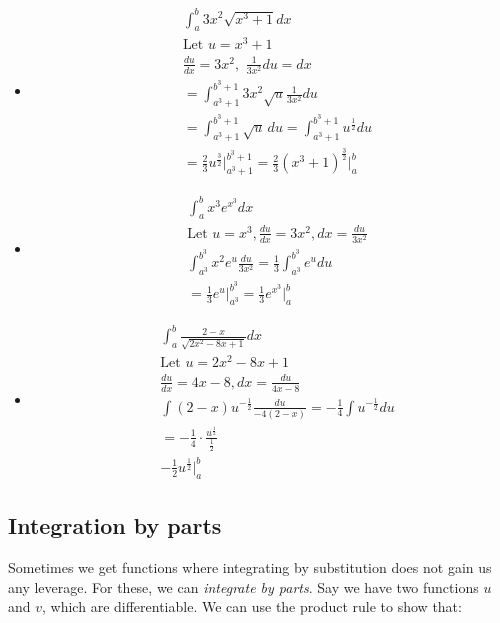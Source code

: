 \begin{itemize}
    \item 
    \begin{align*}
        & \int_a^b 3x^2 \sqrt{x^3 + 1}dx \\
        & \text{Let } u = x^3 + 1 \\
        & \frac{du}{dx} = 3x^2, \, \, \frac{1}{3x^2}du = dx \\
        & = \int_{a^3+1}^{b^3 + 1} 3x^2 \sqrt{u}\frac{1}{3x^2}du \\
        & = \int_{a^3 + 1}^{b^3 + 1} \sqrt{u}\,du = \int_{a^3 + 1}^{b^3 + 1} u^{\frac{1}{2}}du \\
        & = \frac{2}{3}u^{\frac{3}{2}}\Big\vert_{a^3 + 1}^{b^3 + 1} = \frac{2}{3}(x^3 + 1)^{\frac{3}{2}} \Big\vert_a^b
    \end{align*}

    \item 
    \begin{align*}
        & \int_a^b x^3e^{x^3}dx \\
        & \text{Let } u = x^3, \frac{du}{dx} = 3x^2, dx = \frac{du}{3x^2} \\
        & \int_{a^3}^{b^3} x^2e^u \frac{du}{3x^2} = \frac{1}{3}\int_{a^3}^{b^3} e^u du \\
        & = \frac{1}{3} e^u \Big\vert_{a^3}^{b^3} = \frac{1}{3}e^{x^3}\Big\vert_{a}^{b}
    \end{align*}

    \item 
    \begin{align*}
        & \int_a^b \frac{2 - x}{\sqrt{2x^2 - 8x + 1}}dx \\
        & \text{Let } u = 2x^2 - 8x + 1 \\
        & \frac{du}{dx} = 4x - 8, dx = \frac{du}{4x - 8} \\
        & \int (2 - x)u^{-\frac{1}{2}}\frac{du}{-4(2-x)} = - \frac{1}{4}\int u^{-\frac{1}{2}}du \\
        & = -\frac{1}{4} \cdot \frac{u^{\frac{1}{2}}}{\frac{1}{2}} \\
        & -\frac{1}{2}u^{\frac{1}{2}}\Big\vert_a^b
    \end{align*}
\end{itemize}

\subsection{Integration by parts}

Sometimes we get functions where integrating by substitution does not gain us any leverage. For these, we can \emph{integrate by parts}. Say we have two functions $u$ and $v$, which are differentiable. We can use the product rule to show that:

